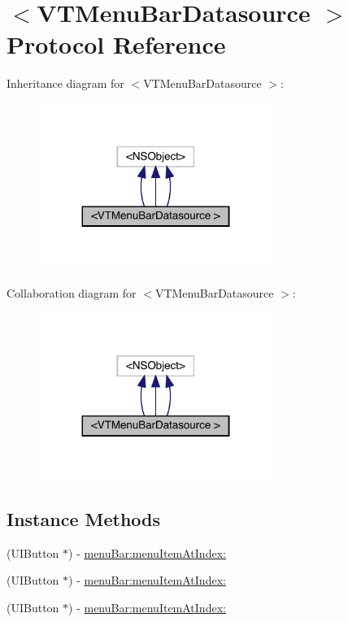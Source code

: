 \hypertarget{protocol_v_t_menu_bar_datasource_01-p}{}\section{$<$V\+T\+Menu\+Bar\+Datasource $>$ Protocol Reference}
\label{protocol_v_t_menu_bar_datasource_01-p}


Inheritance diagram for $<$V\+T\+Menu\+Bar\+Datasource $>$\+:\nopagebreak
\begin{figure}[H]
\begin{center}
\leavevmode
\includegraphics[width=215pt]{protocol_v_t_menu_bar_datasource_01-p__inherit__graph}
\end{center}
\end{figure}


Collaboration diagram for $<$V\+T\+Menu\+Bar\+Datasource $>$\+:\nopagebreak
\begin{figure}[H]
\begin{center}
\leavevmode
\includegraphics[width=215pt]{protocol_v_t_menu_bar_datasource_01-p__coll__graph}
\end{center}
\end{figure}
\subsection*{Instance Methods}
\begin{DoxyCompactItemize}
\item 
(U\+I\+Button $\ast$) -\/ \mbox{\hyperlink{protocol_v_t_menu_bar_datasource_01-p_a2ea6a47a6c08cfc20a33a808f70f0436}{menu\+Bar\+:menu\+Item\+At\+Index\+:}}
\item 
(U\+I\+Button $\ast$) -\/ \mbox{\hyperlink{protocol_v_t_menu_bar_datasource_01-p_a2ea6a47a6c08cfc20a33a808f70f0436}{menu\+Bar\+:menu\+Item\+At\+Index\+:}}
\item 
(U\+I\+Button $\ast$) -\/ \mbox{\hyperlink{protocol_v_t_menu_bar_datasource_01-p_a2ea6a47a6c08cfc20a33a808f70f0436}{menu\+Bar\+:menu\+Item\+At\+Index\+:}}
\end{DoxyCompactItemize}


